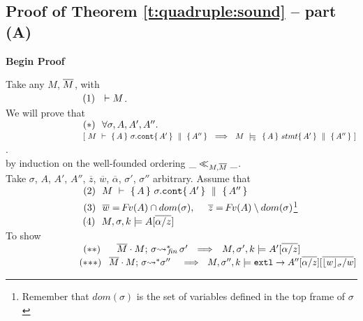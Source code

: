\newcommand{\SPSF}{\SPS \ \ \ \ \ \ \ }
\newcommand{\Aop}{A_{pr}}

\subsection{Proof of Theorem \ref{t:quadruple:sound} -- part (A) }
\label{s:app:proof:sketch;quadruples}
\noindent
\vspace{.2cm}
  {\textbf{Begin Proof}} 


\noindent
Take any $M$, $\overline{M}$, with\\ 
$\strut \ \ \hspace{2.3cm} \ \ (1) \ \ \vdash M $.
\\
We will prove that\\
$\strut \ \ \hspace{2.3cm} \ \ (*)\ \ \forall \sigma, A, A', A''.$\\
$\strut \ \ \hspace{2.3cm} \ \ \ \ \  \ \ [ \ M\ \vdash\  \quadruple {A} {\sigma.\prg{cont}} {A'} {A''}  \ \ \Longrightarrow \ \    M\ \modelsD\  \quadruple {A} {stmt} {A'} {A''}\ ]$.\\
by induction on the well-founded ordering  $\_ \ll_{M,\overline{M}}  \_$.
\\
Take $\sigma$, $A$, $A'$, $A''$, $\overline z$, $\overline w$, $\overline \alpha$, $\sigma'$, $\sigma''$  arbitrary. Assume that\\
$\strut \ \ \hspace{2.3cm} \ \ (2) \ \ M\ \vdash\  \quadruple {A} {\sigma.\prg{cont}} {A'} {A''}$\\
$\strut \ \ \hspace{2.3cm} \ \ (3) \ \ \overline {w}=\fv(A)\cap dom(\sigma), \  \ \ \  \overline z = {\fv(A)\setminus dom(\sigma)}$\footnote{Remember that $dom(\sigma)$ is the set of variables defined in the top frame of $\sigma$} \\
$\strut \ \ \hspace{2.3cm} \ \ (4) \ \ \satDAssertFrom M  \sigma k   {A{[{\overline { \alpha/z}]}}}$\\
To show\\
$\strut \ \ \hspace{2.3cm} \ \ (**)\ \ \  \ \    \leadstoBoundedStarFin {\Mtwo\cdot M}  {\sigma}  {\sigma'}\ \ \Longrightarrow\ \     \satDAssertFrom M  {\sigma'} k   {{A'}{[{\overline {\alpha/z}]}}}$\\
$\strut \ \ \hspace{2.3cm} \ \ (*\!*\!*) \ \ \,    \leadstoBoundedStar  {\Mtwo\cdot M}  {\sigma}  {\sigma''}\ \, \ \ \Longrightarrow\ \     \satDAssertFrom M  {\sigma''}  k  \extThis \rightarrow {{A''[{\overline {\alpha/z}}][\overline{\interpret \sigma {w}/w}]}}$
 
